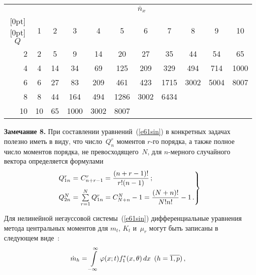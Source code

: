 \begin{multicols}{2}
\begin{table*}[b]
\begin{center}
\tabcolsep=8pt
\begin{tabular}{|r|c|c|c|c|c|c|c|c|c|c|}
\hline
&\multicolumn{10}{c|}{$\bar n_x$}\\
\cline{2-11}
\multicolumn{1}{|c|}{\raisebox{4pt}[0pt][0pt]{$Q$}}&1&2&3&4&5&6&7&8&9&10\\
\hline
2&2&\hphantom{9}5&\hphantom{9}9&\hphantom{9}14&\hphantom{9}20&\hphantom{9}27&\hphantom{99}35&\hphantom{99}44&\hphantom{99}54&\hphantom{99}65\\
4&4&14&34&\hphantom{9}69&125&209&\hphantom{9}329&\hphantom{9}494&\hphantom{9}714&1000\\
6&6&27&83&209&461&423&1715&3002&5004&8007\\
8&8&44&164\hphantom{9}&494&1286\hphantom{9}&3002\hphantom{9}&6434& & & \\
10&10\hphantom{9}&65&1000\hphantom{99}&3002\hphantom{9}&8007\hphantom{9}& & & & & \\
\hline
\end{tabular}
\end{center}
\end{table*}


\smallskip

\noindent
\textbf{Замечание 8.} 
При составлении уравнений~(\ref{e61sin}) в конкретных задачах полезно
иметь в виду, что чис\-ло~$Q_n^r$ моментов $r$-го порядка, а также
полное чис\-ло моментов порядка, не превосходящего~$N$, для $n$-мерного
случайного вектора определяется формулами
\begin{equation}
\!\left.
\!\!\begin{array}{rcl}
 Q_{1n}^r \!\!\!\!&=&\!\!\!\! C_{n+r-1}^r =\fr{(n+r-1)!}{r! (n-1)}\,;\\[9pt]
    Q_{2n}^N\!\!\!\! &=&\!\!\!\!\sss_{r=1}^N Q_{1n}^r = C_{N+n}^N -1 =
\fr{(N+n)!}{N!n!}- 1\,.
\end{array}\!\!\!
\right \}\!\!
\label{e63sin}
\end{equation}
 
Для нелинейной негауссовой системы~(\ref{e61sin}) дифференциальные уравнения метода центральных
моментов для $m_t$, $K_t$ и~$\mu_r$ могут быть записаны в
следующем виде~\cite{7sin, 8sin}:
\begin{equation*}
{\dot m}_h=
    \int\limits_{-\infty}^\infty \varphi (x;t) f_1^*(x,\theta)\,dx\enskip
    (h=\overline{1, p})\,,
    \end{equation*}
    
    \vspace*{-12pt}
    

\end{multicols}

